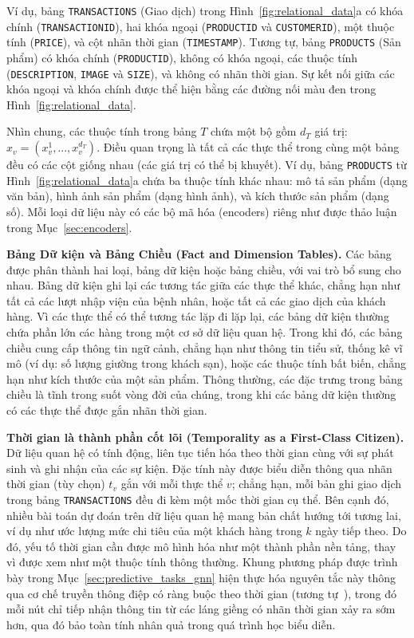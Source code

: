 Ví dụ, bảng \texttt{TRANSACTIONS} (Giao dịch) trong Hình~\ref{fig:relational_data}a có khóa chính (\texttt{TRANSACTIONID}), hai khóa ngoại (\texttt{PRODUCTID} và \texttt{CUSTOMERID}), một thuộc tính (\texttt{PRICE}), và cột nhãn thời gian (\texttt{TIMESTAMP}). Tương tự, bảng \texttt{PRODUCTS} (Sản phẩm) có khóa chính (\texttt{PRODUCTID}), không có khóa ngoại, các thuộc tính (\texttt{DESCRIPTION}, \texttt{IMAGE} và \texttt{SIZE}), và không có nhãn thời gian. Sự kết nối giữa các khóa ngoại và khóa chính được thể hiện bằng các đường nối màu đen trong Hình~\ref{fig:relational_data}.

Nhìn chung, các thuộc tính trong bảng $T$ chứa một bộ gồm $d_{T}$ giá trị: $x_{v}=(x_{v}^{1},...,x_{v}^{d_{T}})$. Điều quan trọng là tất cả các thực thể trong cùng một bảng đều có các cột giống nhau (các giá trị có thể bị khuyết). Ví dụ, bảng \texttt{PRODUCTS} từ Hình~\ref{fig:relational_data}a chứa ba thuộc tính khác nhau: mô tả sản phẩm (dạng văn bản), hình ảnh sản phẩm (dạng hình ảnh), và kích thước sản phẩm (dạng số). Mỗi loại dữ liệu này có các bộ mã hóa (encoders) riêng như được thảo luận trong Mục~\ref{sec:encoders}.

\textbf{Bảng Dữ kiện và Bảng Chiều (Fact and Dimension Tables).} Các bảng được phân thành hai loại, bảng dữ kiện hoặc bảng chiều, với vai trò bổ sung cho nhau. Bảng dữ kiện ghi lại các tương tác giữa các thực thể khác, chẳng hạn như tất cả các lượt nhập viện của bệnh nhân, hoặc tất cả các giao dịch của khách hàng. Vì các thực thể có thể tương tác lặp đi lặp lại, các bảng dữ kiện thường chứa phần lớn các hàng trong một cơ sở dữ liệu quan hệ. Trong khi đó, các bảng chiều cung cấp thông tin ngữ cảnh, chẳng hạn như thông tin tiểu sử, thống kê vĩ mô (ví dụ: số lượng giường trong khách sạn), hoặc các thuộc tính bất biến, chẳng hạn như kích thước của một sản phẩm. Thông thường, các đặc trưng trong bảng chiều là tĩnh trong suốt vòng đời của chúng, trong khi các bảng dữ kiện thường có các thực thể được gắn nhãn thời gian.

\textbf{Thời gian là thành phần cốt lõi (Temporality as a First-Class Citizen).} Dữ liệu quan hệ có tính động, liên tục tiến hóa theo thời gian cùng với sự phát sinh và ghi nhận của các sự kiện. Đặc tính này được biểu diễn thông qua nhãn thời gian (tùy chọn) $t_v$ gắn với mỗi thực thể $v$; chẳng hạn, mỗi bản ghi giao dịch trong bảng \texttt{TRANSACTIONS} đều đi kèm một mốc thời gian cụ thể. Bên cạnh đó, nhiều bài toán dự đoán trên dữ liệu quan hệ mang bản chất hướng tới tương lai, ví dụ như ước lượng mức chi tiêu của một khách hàng trong $k$ ngày tiếp theo. Do đó, yếu tố thời gian cần được mô hình hóa như một thành phần nền tảng, thay vì được xem như một thuộc tính thông thường. Khung phương pháp được trình bày trong Mục~\ref{sec:predictive_tasks_gnn} hiện thực hóa nguyên tắc này thông qua cơ chế truyền thông điệp có ràng buộc theo thời gian (tương tự~\cite{rossi2020temporal}), trong đó mỗi nút chỉ tiếp nhận thông tin từ các láng giềng có nhãn thời gian xảy ra sớm hơn, qua đó bảo toàn tính nhân quả trong quá trình học biểu diễn.
